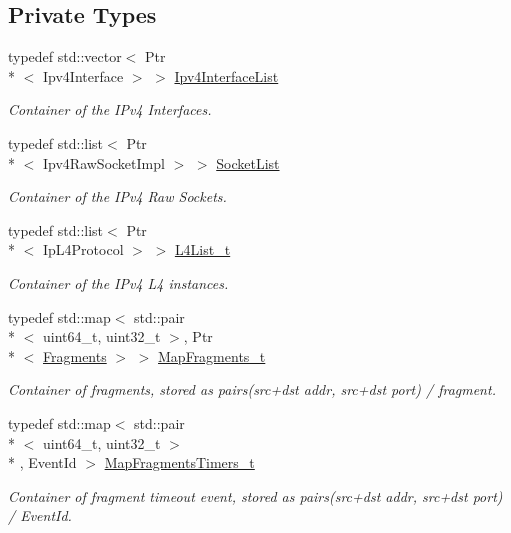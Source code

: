 \subsection*{Private Types}
\begin{DoxyCompactItemize}
\item 
typedef std\-::vector$<$ Ptr\\*
$<$ Ipv4\-Interface $>$ $>$ \hyperlink{classns3_1_1Ipv4RouterL3Protocol_a5756b4cefb3bc08242fcc25ce0694adb}{Ipv4\-Interface\-List}
\begin{DoxyCompactList}\small\item\em Container of the I\-Pv4 Interfaces. \end{DoxyCompactList}\item 
typedef std\-::list$<$ Ptr\\*
$<$ Ipv4\-Raw\-Socket\-Impl $>$ $>$ \hyperlink{classns3_1_1Ipv4RouterL3Protocol_aeaeda330ab6a6f6d7cf4392024f4dc8e}{Socket\-List}
\begin{DoxyCompactList}\small\item\em Container of the I\-Pv4 Raw Sockets. \end{DoxyCompactList}\item 
typedef std\-::list$<$ Ptr\\*
$<$ Ip\-L4\-Protocol $>$ $>$ \hyperlink{classns3_1_1Ipv4RouterL3Protocol_adec096bbe99d3a07e5007ce510a9ca20}{L4\-List\-\_\-t}
\begin{DoxyCompactList}\small\item\em Container of the I\-Pv4 L4 instances. \end{DoxyCompactList}\item 
typedef std\-::map$<$ std\-::pair\\*
$<$ uint64\-\_\-t, uint32\-\_\-t $>$, Ptr\\*
$<$ \hyperlink{classns3_1_1Ipv4RouterL3Protocol_1_1Fragments}{Fragments} $>$ $>$ \hyperlink{classns3_1_1Ipv4RouterL3Protocol_ad13f1d7a6fde1bccea2a986f095bbf9e}{Map\-Fragments\-\_\-t}
\begin{DoxyCompactList}\small\item\em Container of fragments, stored as pairs(src+dst addr, src+dst port) / fragment. \end{DoxyCompactList}\item 
typedef std\-::map$<$ std\-::pair\\*
$<$ uint64\-\_\-t, uint32\-\_\-t $>$\\*
, Event\-Id $>$ \hyperlink{classns3_1_1Ipv4RouterL3Protocol_a1b7e366a2a7bbb1336aacaca4af8997b}{Map\-Fragments\-Timers\-\_\-t}
\begin{DoxyCompactList}\small\item\em Container of fragment timeout event, stored as pairs(src+dst addr, src+dst port) / Event\-Id. \end{DoxyCompactList}\end{DoxyCompactItemize}
